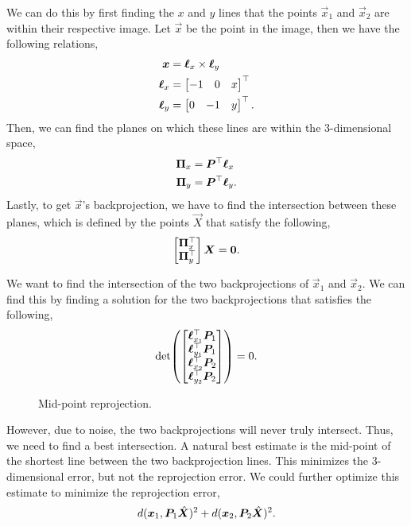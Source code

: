 We can do this by first finding the $x$ and $y$ lines that the points
$\vec{x}_1$ and $\vec{x}_2$ are within their respective image. Let $\vec{x}$ be
the point in the image, then we have the following relations,
\begin{align*}
  \bm{x} &= \bm{\ell}_x \times \bm{\ell}_y \\
  \bm{\ell}_x &= \begin{bmatrix} -1 & 0 & x \end{bmatrix}^\top \\
  \bm{\ell}_y &= \begin{bmatrix} 0 & -1 & y \end{bmatrix}^\top
.\end{align*}
Then, we can find the planes on which these lines are within the 3-dimensional
space,
\begin{align*}
  \bm{\Pi}_x &= \bm{P}^\top \bm{\ell}_x \\
  \bm{\Pi}_y &= \bm{P}^\top \bm{\ell}_y
.\end{align*}
Lastly, to get $\vec{x}$'s backprojection, we have to find the intersection
between these planes, which is defined by the points $\vec{X}$ that satisfy the
following, \[
  \begin{bmatrix} \bm{\Pi}_x^\top \\ \bm{\Pi}_y^\top \end{bmatrix} \bm{X} = \bm{0}
.\]

We want to find the intersection of the two backprojections of $\vec{x}_1$ and
$\vec{x}_2$. We can find this by finding a solution for the two
backprojections that satisfies the following, \[
  \det{\begin{bmatrix} \transpose{\vec{\ell}_{x_1}} \mat{P}_1 \\ \transpose{\vec{\ell}_{y_1}} \mat{P}_1 \\ \transpose{\vec{\ell}_{x_2}} \mat{P}_2 \\ \transpose{\vec{\ell}_{y_2}} \mat{P}_2 \end{bmatrix}} = 0
.\]

\begin{figure}[t]
    \centering
    \caption{Mid-point reprojection.}
    \label{fig:mid-point-reprojection}
\end{figure}

However, due to noise, the two backprojections will never truly intersect.
Thus, we need to find a best intersection. A natural best estimate is the
mid-point of the shortest line between the two backprojection lines. This
minimizes the 3-dimensional error, but not the reprojection error. We could
further optimize this estimate to minimize the reprojection error, \[
  d(\bm{x}_1, \bm{P}_1 \hat{\bm{X}})^2 + d(\bm{x}_2, \bm{P}_2 \hat{\bm{X}})^2
.\]
